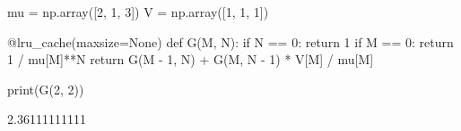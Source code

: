 
mu = np.array([2, 1, 3])
V = np.array([1, 1, 1])


@lru_cache(maxsize=None)
def G(M, N):
    if N == 0:
        return 1
    if M == 0:
        return 1 / mu[M]**N
    return G(M - 1, N) + G(M, N - 1) * V[M] / mu[M]

print(G(2, 2))

2.36111111111

